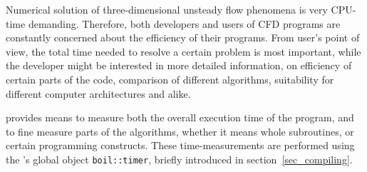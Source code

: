 \label{chap_timing}

Numerical solution of three-dimensional unsteady flow phenomena is 
very CPU-time demanding. Therefore, both developers and users of CFD 
programs are constantly concerned about the efficiency of their programs. 
From user's point of view, the total time needed to resolve a certain
problem is most important, while the developer might be interested in
more detailed information, on efficiency of certain parts of the code,
comparison of different algorithms, suitability for different computer
architectures and alike. 

{\psiboil} provides means to measure both the overall execution time
of the program, and to fine measure parts of the algorithms, whether it
means whole subroutines, or certain programming constructs. These 
time-measurements are performed using the {\psiboil}'s global object
{\tt boil::timer}, briefly introduced in section~\ref{sec_compiling}.
